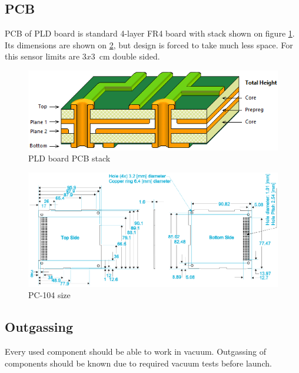 \subsection{PCB}
\label{PCB_description}
	PCB of PLD board is standard 4-layer FR4 board with stack shown on figure \ref{PLD_PCB_stack}. Its dimensions are shown on \ref{PLD_PCB_size}, but design is forced to take much less space. For this sensor limits are $3x3$~cm double sided.

	\begin{figure}[H]
		\centering
		\includegraphics[width=0.5\paperwidth]{img/PLD_PCB_stack.png}
		\caption{PLD board PCB stack}
		\label{PLD_PCB_stack}
	\end{figure}	

	\begin{figure}[H]
		\centering
		\includegraphics[width=0.7\paperwidth]{img/PC104_PLD_size.png}
		\caption{PC-104 size}
		\label{PLD_PCB_size}
	\end{figure}	
		
	

\subsection{Outgassing}
	Every used component should be able to work in vacuum. Outgassing of components should be known due to required vacuum tests before launch.
	
